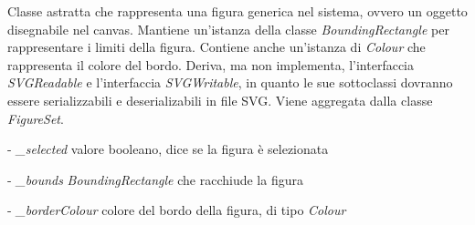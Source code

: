 Classe astratta che rappresenta una figura generica nel sistema, ovvero un oggetto disegnabile nel canvas.
Mantiene un'istanza della classe \textit{BoundingRectangle} per rappresentare i limiti della figura. Contiene anche un'istanza di \textit{Colour} che rappresenta il colore del bordo. Deriva, ma non implementa, l'interfaccia \textit{SVGReadable} e l'interfaccia \textit{SVGWritable}, in quanto le sue sottoclassi dovranno essere serializzabili e deserializabili in file SVG.
Viene aggregata dalla classe \textit{FigureSet}.
\begin{elencopuntato}[\subsubsecindent]
\item[-] \textit{{\_}selected} valore booleano, dice se la figura \`e selezionata
\item[-] \textit{{\_}bounds} \textit{BoundingRectangle} che racchiude la figura
\item[-] \textit{{\_}borderColour} colore del bordo della figura, di tipo \textit{Colour}
\end{elencopuntato}
